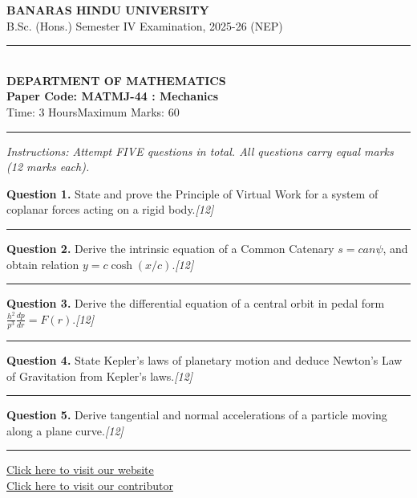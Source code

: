 \documentclass[11pt,a4paper]{article}
\newcommand{\pts}[1]{\hfill   \textit{[#1]}}
\begin{document}
\begin{center}
  {\large\bfseries BANARAS HINDU UNIVERSITY}\\[2pt]
  {\normalsize B.Sc. (Hons.) Semester IV Examination, 2025-26 (NEP)}\\[6pt]
  \rule{0.8\linewidth}{0.5pt}\\[6pt]
  {\large\bfseries DEPARTMENT OF MATHEMATICS}\\[4pt]
  {\large\bfseries Paper Code: MATMJ-44 : Mechanics}\\[4pt]
  {\normalsize Time: 3 Hours\hfill Maximum Marks: 60}
\end{center}

\rule{\linewidth}{0.4pt}

\smallskip



\noindent   \textit{Instructions: Attempt FIVE questions in total. All questions carry equal marks (12 marks each).}

\bigskip




\noindent   \textbf{Question 1.} State and prove the Principle of Virtual Work for a system of coplanar forces acting on a rigid body.\pts{12}

\medskip\rule{\linewidth}{0.2pt}\medskip




\noindent   \textbf{Question 2.} Derive the intrinsic equation of a Common Catenary $s = c  an \psi$, and obtain relation $y = c \cosh(x/c)$.\pts{12}

\medskip\rule{\linewidth}{0.2pt}\medskip




\noindent   \textbf{Question 3.} Derive the differential equation of a central orbit in pedal form $\frac{h^2}{p^3} \frac{dp}{dr} = F(r)$.\pts{12}

\medskip\rule{\linewidth}{0.2pt}\medskip




\noindent   \textbf{Question 4.} State Kepler's laws of planetary motion and deduce Newton's Law of Gravitation from Kepler's laws.\pts{12}

\medskip\rule{\linewidth}{0.2pt}\medskip




\noindent   \textbf{Question 5.} Derive tangential and normal accelerations of a particle moving along a plane curve.\pts{12}

\vfill
\rule{\linewidth}{0.4pt}

\begin{center}\small
\href{https://bhu-exam.vercel.app/}{Click here to visit our website}\\[4pt]
\href{https://me-aryan.vercel.app/}{Click here to visit our contributor}
\end{center}
\end{document}
